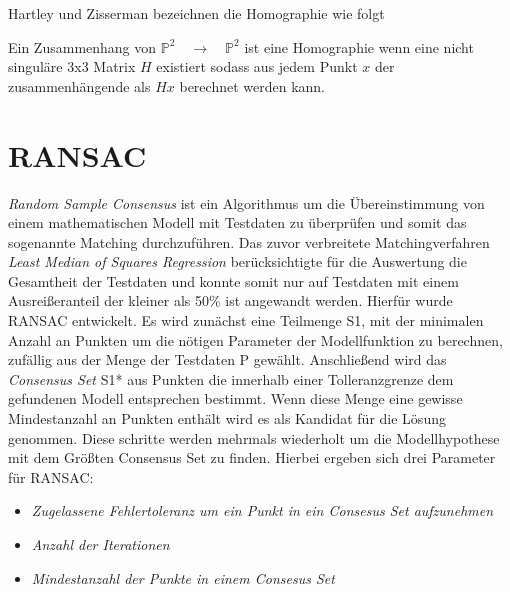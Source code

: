 Hartley und Zisserman bezeichnen die Homographie wie folgt\:

Ein Zusammenhang von $\mathbb{P}^2 \quad \rightarrow \quad \mathbb{P}^2$ ist eine Homographie wenn eine nicht singuläre 3x3 Matrix $H$ existiert sodass aus jedem Punkt $x$ der zusammenhängende als $Hx$ berechnet werden kann. \cite{harzis}

\section{RANSAC}
\emph{Random Sample Consensus} ist ein Algorithmus um die Übereinstimmung von einem mathematischen Modell mit Testdaten zu überprüfen und somit das sogenannte Matching durchzuführen.
Das zuvor verbreitete Matchingverfahren \emph{Least Median of Squares Regression} berücksichtigte für die Auswertung die Gesamtheit der Testdaten und konnte somit nur auf Testdaten mit einem Ausreißeranteil der kleiner als 50\% ist angewandt werden.
Hierfür wurde RANSAC entwickelt.
Es wird zunächst eine Teilmenge S1, mit der minimalen Anzahl an Punkten um die nötigen Parameter der Modellfunktion zu berechnen, zufällig aus der Menge der Testdaten P gewählt. 
Anschließend wird das \emph{Consensus Set} S1* aus Punkten die innerhalb einer Tolleranzgrenze dem gefundenen Modell entsprechen bestimmt.
Wenn diese Menge eine gewisse Mindestanzahl an Punkten enthält wird es als Kandidat für die Lösung genommen.
Diese schritte werden mehrmals wiederholt um die Modellhypothese mit dem Größten Consensus Set zu finden.
Hierbei ergeben sich drei Parameter für RANSAC:
\begin{itemize}
\item \emph{Zugelassene Fehlertoleranz um ein Punkt in ein Consesus Set aufzunehmen}
\item \emph{Anzahl der Iterationen}
\item \emph{Mindestanzahl der Punkte in einem Consesus Set}
\end{itemize}
\cite{fis80}